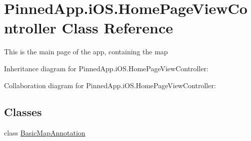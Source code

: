 \hypertarget{class_pinned_app_1_1i_o_s_1_1_home_page_view_controller}{}\section{Pinned\+App.\+i\+O\+S.\+Home\+Page\+View\+Controller Class Reference}
\label{class_pinned_app_1_1i_o_s_1_1_home_page_view_controller}


This is the main page of the app, containing the map  




Inheritance diagram for Pinned\+App.\+i\+O\+S.\+Home\+Page\+View\+Controller\+:


Collaboration diagram for Pinned\+App.\+i\+O\+S.\+Home\+Page\+View\+Controller\+:
\subsection*{Classes}
\begin{DoxyCompactItemize}
\item 
class \hyperlink{class_pinned_app_1_1i_o_s_1_1_home_page_view_controller_1_1_basic_map_annotation}{Basic\+Map\+Annotation}
\end{DoxyCompactItemize}
